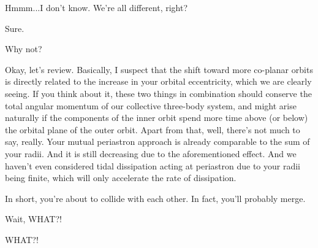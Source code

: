 \documentclass[main.tex]{subfiles}
\begin{document}
\par \Celaeno Hmmm...I don't know.  We're all different, right? 

\par \Alcyone Sure.

\par \Taygete Why not?

\par \Celaeno Okay, let's review.  Basically, I suspect that the shift toward more co-planar orbits is directly related to the increase in your orbital eccentricity, which we are clearly seeing.  If you think about it, these two things in combination should conserve the total angular momentum of our collective three-body system, and might arise naturally if the components of the inner orbit spend more time above (or below) the orbital plane of the outer orbit.  Apart from that, well, there's not much to say, really.  Your mutual periastron approach is already comparable to the sum of your radii.  And it is still decreasing due to the aforementioned effect.  And we haven't even considered tidal dissipation acting at periastron due to your radii being finite, which will only accelerate the rate of dissipation.

\par \Celaeno In short, you're about to collide with each other.  In fact, you'll probably merge.

\par \Taygete  Wait, WHAT?!

\par \Alcyone  WHAT?!
\end{document}
